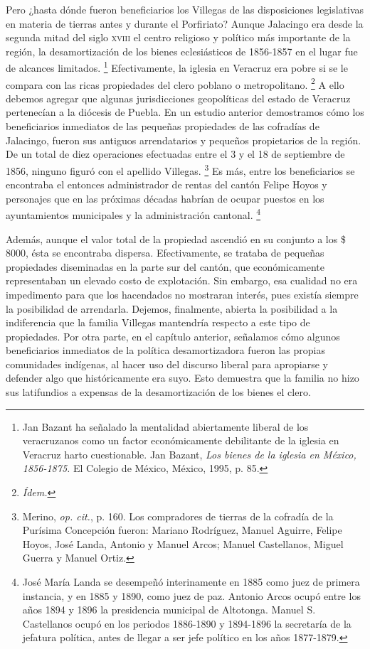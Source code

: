\documentclass[14pt,twoside,final]{extbook} %
\let\oldfootnote\footnote
\renewcommand\footnote[1]{%
\oldfootnote{\hspace{1mm}#1}}
\begin{document}
Pero ¿hasta dónde fueron beneficiarios los Villegas de las disposiciones legislativas en materia de tierras antes y durante el Porfiriato? Aunque Jalacingo era desde la segunda mitad del siglo \textsc{xviii} el centro religioso y político más importante de la región, la desamortización de los bienes eclesiásticos de 1856-1857 en el lugar fue de alcances limitados.\footnote{Jan Bazant ha señalado la mentalidad abiertamente liberal de los veracruzanos como un factor económicamente debilitante de la iglesia en Veracruz harto cuestionable. Jan Bazant, \emph{Los bienes de la iglesia en México, 1856-1875.} El Colegio de México, México, 1995, p. 85.} Efectivamente, la iglesia en Veracruz era pobre si se le compara con las ricas propiedades del clero poblano o metropolitano.\footnote{\em Ídem.} A ello debemos agregar que algunas jurisdicciones geopolíticas del estado de Veracruz pertenecían a la diócesis de Puebla. En un estudio anterior demostramos cómo los beneficiarios inmediatos de las pequeñas propiedades de las cofradías de Jalacingo, fueron sus antiguos arrendatarios y pequeños propietarios de la región. De un total de diez operaciones efectuadas entre el 3 y el 18 de septiembre de 1856, ninguno figuró con el apellido Villegas.\footnote{Merino, \emph{op. cit.}, p. 160. Los compradores de tierras de la cofradía de la Purísima Concepción fueron: Mariano Rodríguez, Manuel Aguirre, Felipe Hoyos, José Landa, Antonio y Manuel Arcos; Manuel Castellanos, Miguel Guerra y Manuel Ortiz.} Es más, entre los beneficiarios se encontraba el entonces administrador de rentas del cantón Felipe Hoyos y personajes que en las próximas décadas habrían de ocupar puestos en los ayuntamientos municipales y la administración cantonal.\footnote{José María Landa se desempeñó interinamente en 1885 como juez de primera instancia, y en 1885 y 1890, como juez de paz. Antonio Arcos ocupó entre los años 1894 y 1896 la presidencia municipal de Altotonga. Manuel S. Castellanos ocupó en los periodos 1886-1890 y 1894-1896 la secretaría de la jefatura política, antes de llegar a ser jefe político en los años 1877-1879.}

Además, aunque el valor total de la propiedad ascendió en su conjunto a los \$ 8000, ésta se encontraba dispersa. Efectivamente, se trataba de pequeñas propiedades diseminadas en la parte sur del cantón, que económicamente representaban un elevado costo de explotación. Sin embargo, esa cualidad no era impedimento para que los hacendados no mostraran interés, pues existía siempre la posibilidad de arrendarla. Dejemos, finalmente, abierta la posibilidad a la indiferencia que la familia Villegas mantendría respecto a este tipo de propiedades. Por otra parte, en el capítulo anterior, señalamos cómo algunos beneficiarios inmediatos de la política desamortizadora fueron las propias comunidades indígenas, al hacer uso del discurso liberal para apropiarse y defender algo que históricamente era suyo. Esto demuestra que la familia no hizo sus latifundios a expensas de la desamortización de los bienes el clero.
\end{document}
